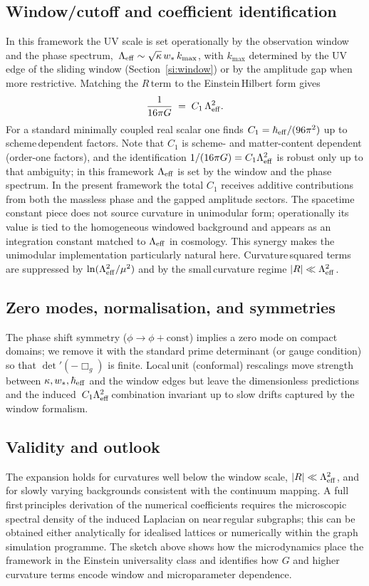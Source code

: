 \documentclass[11pt]{article}
\begin{document}
\subsection*{Window/cutoff and coefficient identification}
In this framework the UV scale is set operationally by the observation window and the phase spectrum, \,$\Lambda_{\rm eff}\sim \sqrt{\kappa}\, w_*\, k_{\max}$, with $k_{\max}$ determined by the UV edge of the sliding window (Section~\ref{si:window}) or by the amplitude gap when more restrictive. Matching the $R$\,term to the Einstein\,Hilbert form gives
\begin{equation}
  \frac{1}{16\pi G} \;=\; C_1\, \Lambda_{\rm eff}^2.
\end{equation}
For a standard minimally coupled real scalar one finds $C_1 = \hbar_{\rm eff}/(96\pi^2)$ up to scheme\,dependent factors. Note that $C_1$ is scheme- and matter-content dependent (order-one factors), and the identification $1/(16\pi G) = C_1 \Lambda_{\rm eff}^2$ is robust only up to that ambiguity; in this framework $\Lambda_{\rm eff}$ is set by the window and the phase spectrum. In the present framework the total $C_1$ receives additive contributions from both the massless phase and the gapped amplitude sectors. The spacetime\,constant piece does not source curvature in unimodular form; operationally its value is tied to the homogeneous windowed background and appears as an integration constant matched to $\Lambda_{\rm eff}$ in cosmology. This synergy makes the unimodular implementation particularly natural here. Curvature\,squared terms are suppressed by $\ln(\Lambda_{\rm eff}^2/\mu^2)$ and by the small\,curvature regime $|R|\ll \Lambda_{\rm eff}^2$.

\subsection*{Zero modes, normalisation, and symmetries}
The phase shift symmetry ($\phi\!\to\!\phi+\text{const}$) implies a zero mode on compact domains; we remove it with the standard prime determinant (or gauge condition) so that $\det'(-\Box_g)$ is finite. Local\,unit (conformal) rescalings move strength between $\kappa, w_*, \hbar_{\rm eff}$ and the window edges but leave the dimensionless predictions and the induced \,$C_1\Lambda_{\rm eff}^2$\,combination invariant up to slow drifts captured by the window formalism.

\subsection*{Validity and outlook}
The expansion holds for curvatures well below the window scale, $|R|\ll \Lambda_{\rm eff}^2$, and for slowly varying backgrounds consistent with the continuum mapping. A full first\,principles derivation of the numerical coefficients requires the microscopic spectral density of the induced Laplacian on near\,regular subgraphs; this can be obtained either analytically for idealised lattices or numerically within the graph simulation programme. The sketch above shows how the microdynamics place the framework in the Einstein universality class and identifies how $G$ and higher\,curvature terms encode window and microparameter dependence.
\end{document}

